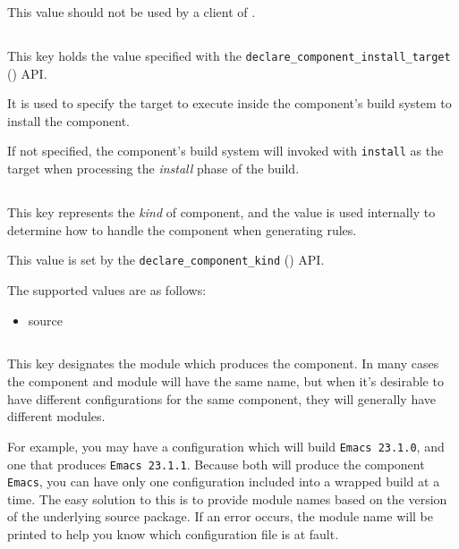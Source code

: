 This value should not be used by a client of \lmsbw.

\subsection{}
This key holds the value specified with the
\texttt{declare\_component\_install\_target}
() API.

It is used to specify the target to execute inside the component's
build system to install the component.

If not specified, the component's build system will invoked with
\texttt{install} as the target when processing the \emph{install}
phase of the build.

\subsection{}

This key represents the \emph{kind} of component, and the value is
used internally to determine how to handle the component when
generating rules.

This value is set by the \texttt{declare\_component\_kind}
() API.

The supported values are as follows:

\begin{itemize}
\item source
\end{itemize}

\subsection{}

This key designates the module which produces the component.  In many
cases the component and module will have the same name, but when it's
desirable to have different configurations for the same component,
they will generally have different modules.

For example, you may have a configuration which will build
\texttt{Emacs 23.1.0}, and one that produces \texttt{Emacs 23.1.1}.
Because both will produce the component \texttt{Emacs}, you can have
only one configuration included into a wrapped build at a time.  The
easy solution to this is to provide module names based on the version
of the underlying source package.
If an error occurs, the module name will be printed to help you know
which configuration file is at fault.

